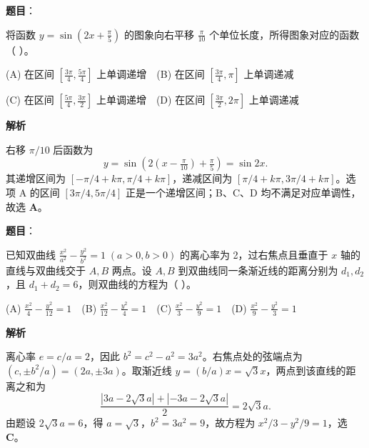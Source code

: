 \begin{answer}

\textbf{题目}：

将函数 $y=\sin\left(2x+\frac\pi5\right)$ 的图象向右平移 $\frac\pi{10}$ 个单位长度，所得图象对应的函数（ ）。

(A) 在区间 $\left[\frac{3\pi}4,\frac{5\pi}4\right]$ 上单调递增　(B) 在区间 $\left[\frac{3\pi}4,\pi\right]$ 上单调递减

(C) 在区间 $\left[\frac{5\pi}4,\frac{3\pi}2\right]$ 上单调递增　(D) 在区间 $\left[\frac{3\pi}2,2\pi\right]$ 上单调递减

\textbf{解析}

右移 $\pi/10$ 后函数为
\nopagebreak[4]
\[y=\sin\left(2(x-\tfrac\pi{10})+\tfrac\pi5\right)=\sin2x.\]
其递增区间为 $[-\pi/4+k\pi,\pi/4+k\pi]$，递减区间为 $[\pi/4+k\pi,3\pi/4+k\pi]$。选项 A 的区间 $[3\pi/4,5\pi/4]$ 正是一个递增区间；B、C、D 均不满足对应单调性，故选 \textbf{A}。


\end{answer}
\begin{answer}

\textbf{题目}：

已知双曲线 $\frac{x^2}{a^2}-\frac{y^2}{b^2}=1\;(a>0,b>0)$ 的离心率为 2，过右焦点且垂直于 $x$ 轴的直线与双曲线交于 $A,B$ 两点。设 $A,B$ 到双曲线同一条渐近线的距离分别为 $d_1,d_2$，且 $d_1+d_2=6$，则双曲线的方程为（ ）。

(A) $\frac{x^2}{4}-\frac{y^2}{12}=1$　(B) $\frac{x^2}{12}-\frac{y^2}{4}=1$　(C) $\frac{x^2}{3}-\frac{y^2}{9}=1$　(D) $\frac{x^2}{9}-\frac{y^2}{3}=1$

\textbf{解析}

离心率 $e=c/a=2$，因此 $b^2=c^2-a^2=3a^2$。右焦点处的弦端点为 $(c,\pm b^2/a)=(2a,\pm3a)$。取渐近线 $y=(b/a)x=\sqrt3x$，两点到该直线的距离之和为
\nopagebreak[4]
\[\frac{|3a-2\sqrt3a|+|-3a-2\sqrt3a|}{2}=2\sqrt3a.\]
由题设 $2\sqrt3a=6$，得 $a=\sqrt3$，$b^2=3a^2=9$，故方程为 $x^2/3-y^2/9=1$，选 \textbf{C}。


\end{answer}
